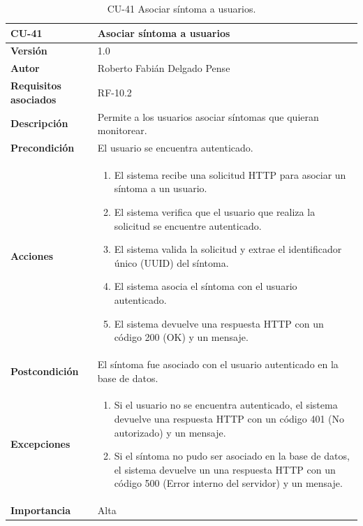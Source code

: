 \begin{table}[p]
	\centering
	\begin{tabularx}{\linewidth}{ p{} p{} }
		\toprule
		\textbf{CU-41}    & \textbf{Asociar síntoma a usuarios}\\
		\toprule
		\textbf{Versión}              & 1.0    \\
		\textbf{Autor}                & Roberto Fabián Delgado Pense \\
		\textbf{Requisitos asociados} & RF-10.2 \\ 
		\textbf{Descripción}          & Permite a los usuarios asociar síntomas que quieran monitorear.\\
		\textbf{Precondición}         & El usuario se encuentra autenticado. \\  
		\textbf{Acciones}             &
		\begin{enumerate}
			\def\labelenumi{\arabic{enumi}.}
			\tightlist
			\item El sistema recibe una solicitud HTTP para asociar un síntoma a un usuario.
                \item El sistema verifica que el usuario que realiza la solicitud se encuentre autenticado.
                \item El sistema valida la solicitud y extrae el identificador único (UUID) del síntoma.
                \item El sistema asocia el síntoma con el usuario autenticado.
                \item El sistema devuelve una respuesta HTTP con un código 200 (OK) y un mensaje.         
            \end{enumerate}\\
		\textbf{Postcondición}        & El síntoma fue asociado con el usuario autenticado en la base de datos. \\
		\textbf{Excepciones}          & 
              \begin{enumerate}
			\def\labelenumi{\arabic{enumi}.}
			\tightlist
   			\item Si el usuario no se encuentra autenticado, el sistema devuelve una respuesta HTTP con un código 401 (No autorizado) y un mensaje.
                \item   Si el síntoma no pudo ser asociado en la base de datos, el sistema devuelve un                           una respuesta HTTP con un código  500 (Error interno del servidor) y un mensaje. 
            \end{enumerate}\\
		\textbf{Importancia}          & Alta \\
		\bottomrule
	\end{tabularx}
	\caption{CU-41 Asociar síntoma a usuarios.}
\end{table}

